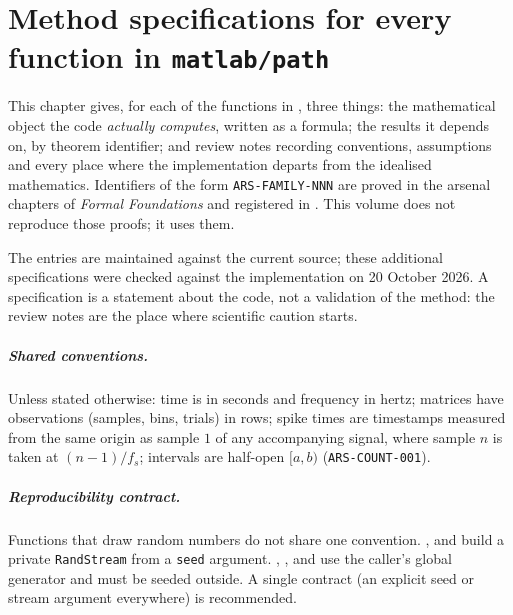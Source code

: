\chapter[Method specifications]{Method specifications for every function in \texttt{matlab/path}}\label{ch:method-specifications}
This chapter gives, for each of the functions in , three things: the mathematical object the code \emph{actually computes}, written as a formula; the results it depends on, by theorem identifier; and review notes recording conventions, assumptions and every place where the implementation departs from the idealised mathematics. Identifiers of the form \texttt{ARS-FAMILY-NNN} are proved in the arsenal chapters of \emph{Formal Foundations} and registered in . This volume does not reproduce those proofs; it uses them.

The entries are maintained against the current source; these additional specifications were checked against the implementation on 20 October 2026. A specification is a statement about the code, not a validation of the method: the review notes are the place where scientific caution starts.

\paragraph{Shared conventions.} Unless stated otherwise: time is in seconds and frequency in hertz; matrices have observations (samples, bins, trials) in rows; spike times are timestamps measured from the same origin as sample $1$ of any accompanying signal, where sample $n$ is taken at $(n-1)/f_s$; intervals are half-open $[a,b)$ (\texttt{ARS-COUNT-001}).

\paragraph{Reproducibility contract.} Functions that draw random numbers do not share one convention. ,  and  build a private \texttt{RandStream} from a \texttt{seed} argument. , ,  and  use the caller's global generator and must be seeded outside. A single contract (an explicit seed or stream argument everywhere) is recommended.

\providecommand{\methodentry}[4]{%
\par\medskip\noindent\textbf{\path{#1}}\par
\noindent\textit{Computes.} #2\par
\noindent\textit{Relies on.} #3\par
\noindent\textit{Review.} #4\par}

